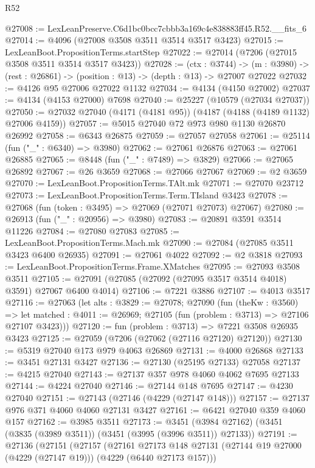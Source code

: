 \begin{lexlean}{R52}
\begin{coremodule}
@27008 := LexLeanPreserve.C6d1bc0bcc7cbbb3a169c4e838883ff45.R52.__fits_6
@27014 := @4096 (@27008 @3508 @3511 @3514 @3517 @3423)
@27015 := LexLeanBoot.PropositionTerms.startStep
@27022 := @27014 (@7206 (@27015 @3508 @3511 @3514 @3517 @3423))
@27028 := (ctx : @3744) ->
  (m : @3980) -> (rest : @26861) -> (position : @13) -> (depth : @13) -> @27007 @27022
@27032 := @4126 @95 @27006 @27022 @1132
@27034 := @4134 (@4150 @27002)
@27037 := @4134 (@4153 @27000) @7698
@27040 := @25227 (@10579 (@27034 @27037))
@27050 := @27032 @27040 (@4171 (@4181 @95)) (@4187 (@4188 (@4189 @1132) @27006 @4159))
@27057 := @5015 @27040 @72 @973 @980 @1130 @26870 @26992
@27058 := @6343 @26875
@27059 := @27057 @27058
@27061 := @25114 (fun ("_" : @6340) => @3980)
@27062 := @27061 @26876
@27063 := @27061 @26885
@27065 := @8448 (fun ("_" : @7489) => @3829)
@27066 := @27065 @26892
@27067 := @26 @3659
@27068 := @27066 @27067
@27069 := @2 @3659
@27070 := LexLeanBoot.PropositionTerms.TAlt.mk
@27071 := @27070 @23712
@27073 := LexLeanBoot.PropositionTerms.Term.TIsland @3423
@27078 := @27068 (fun (token : @3495) => @27069 (@27071 @27073) @27067)
@27080 := @26913 (fun ("_" : @20956) => @3980)
@27083 := @20891 @3591 @3514 @11226
@27084 := @27080 @27083
@27085 := LexLeanBoot.PropositionTerms.Mach.mk
@27090 := @27084 (@27085 @3511 @3423 @6400 @26935)
@27091 := @27061 @4022
@27092 := @2 @3818
@27093 := LexLeanBoot.PropositionTerms.Frame.XMatches
@27095 := @27093 @3508 @3511
@27105 := @27091 (@27085 (@27092 (@27095 @3517 @3514 @4018) @3591) @27067 @6400 @4014)
@27106 := @7221 @3886
@27107 := @4013 @3517
@27116 := @27063
    (let alts : @3829 := @27078;
    @27090
      (fun (theKw : @3560) =>
      let matched : @4011 := @26969; @27105 (fun (problem : @3713) => @27106 @27107 @3423)))
@27120 := fun (problem : @3713) => @7221 @3508 @26935 @3423
@27125 := @27059 (@7206 (@27062 (@27116 @27120) @27120))
@27130 := @5319 @27040 @173 @979 @4063 @26869
@27131 := @4000 @26868
@27133 := @3451 @27131 @3427
@27136 := @27130 (@25195 @27133) @27058
@27137 := @4215 @27040
@27143 := @27137 @357 @978 @4060 @4062 @7695 @27133
@27144 := @4224 @27040
@27146 := @27144 @148 @7695
@27147 := @4230 @27040
@27151 := @27143 (@27146 (@4229 (@27147 @148)))
@27157 := @27137 @976 @371 @4060 @4060 @27131 @3427
@27161 := @6421 @27040 @359 @4060 @157
@27162 := @3985 @3511
@27173 := @3451 (@3984 @27162) (@3451 (@3835 (@3989 @3511)) (@3451 (@3995 (@3996 @3511)) @27133))
@27191 := @27136
    (@27151
      (@27157
        (@27161
          @27173
          @148
          @27131
          (@27144 @19 @27000 (@4229 (@27147 @19)))
          (@4229 (@6440 @27173 @157)))

\end{coremodule}
\end{lexlean}
